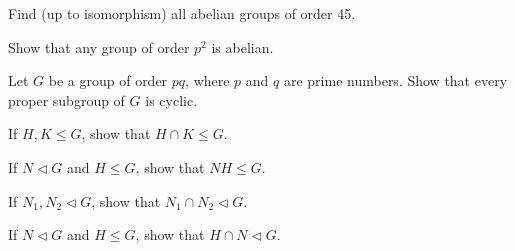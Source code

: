 \begin{mdframed}
    \vspace{0.752cm}
    \begin{Exercise}
        Find (up to isomorphism) all abelian groups of order 45.
    \end{Exercise}

    \vspace{0.752cm}
    \begin{Exercise}
        Show that any group of order $p^2$ is abelian.
    \end{Exercise}

    \vspace{0.752cm}
    \begin{Exercise}
        Let $G$ be a group of order $pq$, where $p$ and $q$ are prime numbers. Show that every proper subgroup of $G$
        is cyclic.
    \end{Exercise}


    \vspace{0.752cm}
    \begin{Exercise}
        If $H, K \leq G$, show that $H \cap K \leq G$.
    \end{Exercise}

    \vspace{0.752cm}
    \begin{Exercise}
        If $N \vartriangleleft G$ and $H \leq G$, show that $NH \leq G$.
    \end{Exercise}

    \vspace{0.752cm}
    \begin{Exercise}
        If $N_1, N_2 \vartriangleleft G$, show that $N_1 \cap N_2 \vartriangleleft G$.
    \end{Exercise}


    \vspace{0.752cm}
    \begin{Exercise}
        If $N \vartriangleleft G$ and $H \leq G$, show that $H \cap N \vartriangleleft G$.
    \end{Exercise}
\end{mdframed}